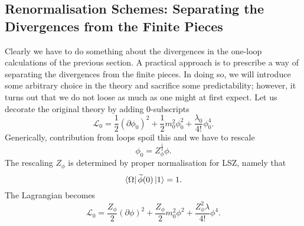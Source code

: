 
\subsection{Renormalisation Schemes: Separating the Divergences from the Finite Pieces}%
\label{sub:separating_the_divergences_from_the_finite_pieces}

Clearly we have to do something about the divergences in the one-loop calculations of the previous section.
A practical approach is to prescribe a way of separating the divergences from the finite pieces.
In doing so, we will introduce some arbitrary choice in the theory and sacrifice some predictability; however, it turns out that we do not loose as much as one might at first expect.
Let us decorate the original theory by adding $0$-subscripts
\begin{equation}
  \mathscr{L}_0 = \frac{1}{2} (\partial \phi_0)^2 + \frac{1}{2} m_0^2 \phi_0^2 + \frac{\lambda_0}{4!}\phi_0^4.
\end{equation}
Generically, contribution from loops spoil this and we have to rescale 
\begin{equation}
  \phi_0 = Z_{\phi}^{\frac{1}{2}} \phi.
\end{equation}
The rescaling $Z_\phi$  is determined by proper normalisation for LSZ, namely that 
\begin{equation}
  \bra{\Omega} \widetilde{\phi}(0) \ket{1} = 1.
\end{equation}
The Lagrangian becomes
\begin{equation}
  \mathscr{L}_0 = \frac{Z_\phi}{2} (\partial \phi)^2 + \frac{Z_\phi}{2}m_0^2 \phi^2 + \frac{Z_\phi^2\lambda}{4!} \phi^4.
\end{equation}

